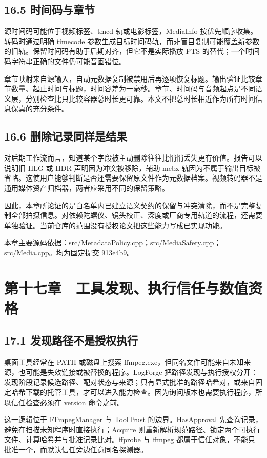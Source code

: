 \documentclass[UTF8,zihao=-4,openany]{ctexbook}
\begin{document}
\section*{16.5 时间码与章节}
源时间码可能位于视频标签、tmcd 轨或电影标签，MediaInfo 按优先顺序收集。转码时通过明确 timecode 参数生成目标时间码轨，而非盲目复制可能覆盖新参数的旧轨。保留时间码有助于后期对齐，但它不是实际播放 PTS 的替代；一个时间码字符串正确的文件仍可能音画错位。

章节映射来自源输入，自动元数据复制被禁用后再逐项恢复标题。输出验证比较章节数量、起止时间与标题，时间容差为一毫秒。章节、时间码与音频起点是不同语义层，分别检查比只比较容器总时长更可靠。本文不把总时长相近作为所有时间信息保真的充分条件。


\section*{16.6 删除记录同样是结果}
对后期工作流而言，知道某个字段被主动删除往往比悄悄丢失更有价值。报告可以说明旧 HLG 或 HDR 声明因为冲突被移除，辅助 mebx 轨因为不属于输出目标被省略。这使用户能够判断是否还需要保留原文件作为元数据档案。视频转码器不是通用媒体资产归档器，两者应采用不同的保留策略。

因此，本章所论证的是白名单内已建立语义契约的保留与冲突清除，而不是完整复制全部拍摄信息。对依赖陀螺仪、镜头校正、深度或厂商专用轨道的流程，还需要单独验证。当前仓库的范围没有授权论文把这些能力写成已实现功能。


\par\small 本章主要源码依据：src/MetadataPolicy.cpp；src/MediaSafety.cpp；src/Media.cpp。均为固定提交 913e4b9。\normalsize

\chapter*{第十七章　工具发现、执行信任与数值资格}

\section*{17.1 发现路径不是授权执行}
桌面工具经常在 PATH 或磁盘上搜索 ffmpeg.exe，但同名文件可能来自未知来源，也可能是失效链接或被替换的程序。LogForge 把路径发现与执行授权分开：发现阶段记录候选路径、配对状态与来源；只有显式批准的路径哈希对，或来自固定哈希下载的托管工具，才可以进入能力检查。因为询问版本也需要执行程序，所以信任检查必须在 version 命令之前。

这一逻辑位于 FFmpegManager 与 ToolTrust 的边界。HasApproval 先查询记录，避免在扫描未知程序时直接执行；Acquire 则重新解析规范路径、锁定两个可执行文件、计算哈希并与批准记录比对。ffprobe 与 ffmpeg 都属于信任对象，不能只批准一个，而默认信任旁边任意同名探测器。
\end{document}
